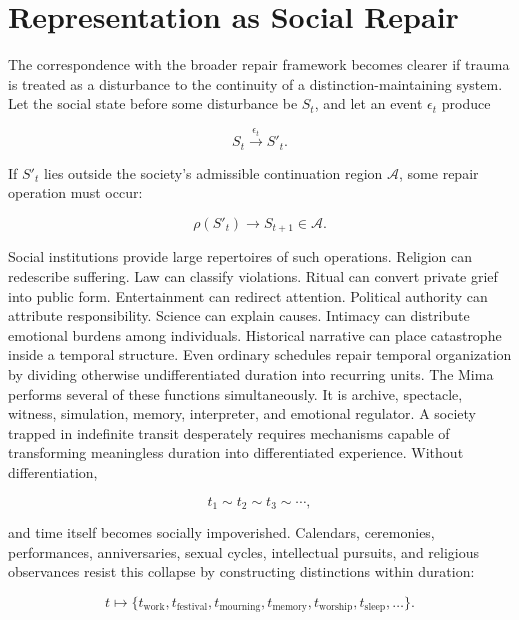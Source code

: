 \documentclass[11pt,oneside]{book}
\theoremstyle{definition}
\theoremstyle{remark}
\begin{document}
\section{Representation as Social Repair}

The correspondence with the broader repair framework becomes clearer if trauma is treated as a
disturbance to the continuity of a distinction-maintaining system. Let the social state before some
disturbance be \(S_t\), and let an event \(\epsilon_t\) produce

\[
S_t\xrightarrow{\epsilon_t}S'_t.
\]

If \(S'_t\) lies outside the society's admissible continuation region \(\mathcal{A}\), some repair
operation must occur:

\[
\rho(S'_t)\rightarrow S_{t+1}\in\mathcal{A}.
\]

Social institutions provide large repertoires of such operations. Religion can redescribe suffering.
Law can classify violations. Ritual can convert private grief into public form. Entertainment can
redirect attention. Political authority can attribute responsibility. Science can explain causes.
Intimacy can distribute emotional burdens among individuals. Historical narrative can place
catastrophe inside a temporal structure. Even ordinary schedules repair temporal organization by
dividing otherwise undifferentiated duration into recurring units. The Mima performs several of
these functions simultaneously. It is archive, spectacle, witness, simulation, memory, interpreter,
and emotional regulator. A society trapped in indefinite transit desperately requires mechanisms
capable of transforming meaningless duration into differentiated experience. Without
differentiation,

\[
t_1\sim t_2\sim t_3\sim\cdots,
\]

and time itself becomes socially impoverished. Calendars, ceremonies, performances, anniversaries,
sexual cycles, intellectual pursuits, and religious observances resist this collapse by constructing
distinctions within duration:

\[
t \mapsto \{ t_{\mathrm{work}}, t_{\mathrm{festival}}, t_{\mathrm{mourning}}, t_{\mathrm{memory}}, t_{\mathrm{worship}}, t_{\mathrm{sleep}}, \ldots \}.
\]
\end{document}
